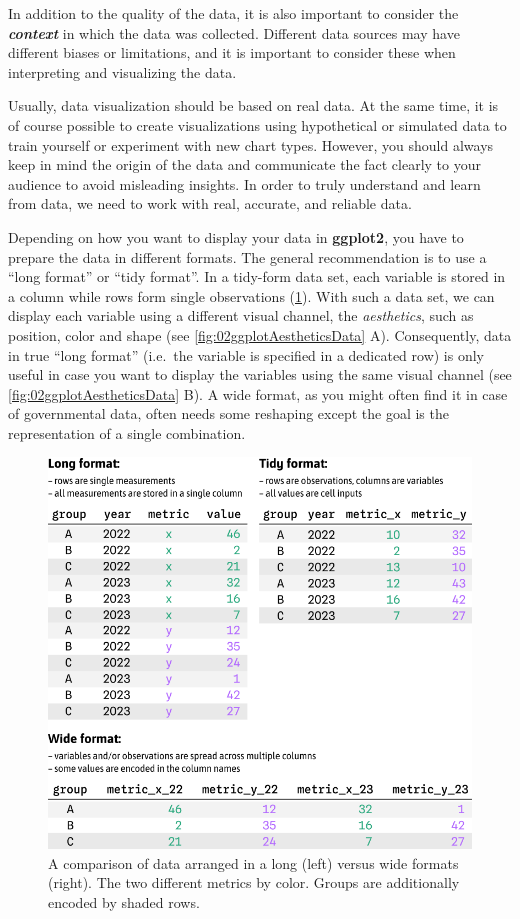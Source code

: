 \documentclass[
]{krantz}
\begin{document}
In addition to the quality of the data, it is also important to consider the \textbf{\emph{context}} in which the data was collected. Different data sources may have different biases or limitations, and it is important to consider these when interpreting and visualizing the data.

Usually, data visualization should be based on real data. At the same time, it is of course possible to create visualizations using hypothetical or simulated data to train yourself or experiment with new chart types. However, you should always keep in mind the origin of the data and communicate the fact clearly to your audience to avoid misleading insights. In order to truly understand and learn from data, we need to work with real, accurate, and reliable data.

Depending on how you want to display your data in \textbf{ggplot2}, you have to prepare the data in different formats. The general recommendation is to use a ``long format'' or ``tidy format''. In a tidy-form data set, each variable is stored in a column while rows form single observations (\ref{fig:02imgFormatLongTidyWide}). With such a data set, we can display each variable using a different visual channel, the \emph{aesthetics}, such as position, color and shape (see \ref{fig:02ggplotAestheticsData} A). Consequently, data in true ``long format'' (i.e.~the variable is specified in a dedicated row) is only useful in case you want to display the variables using the same visual channel (see \ref{fig:02ggplotAestheticsData} B). A wide format, as you might often find it in case of governmental data, often needs some reshaping except the goal is the representation of a single combination.

\begin{figure}
\centering
\includegraphics{./img/table-format-long-tidy-wide.png}
\caption{\label{fig:02imgFormatLongTidyWide}A comparison of data arranged in a long (left) versus wide formats (right). The two different metrics by color. Groups are additionally encoded by shaded rows.}
\end{figure}
\end{document}
